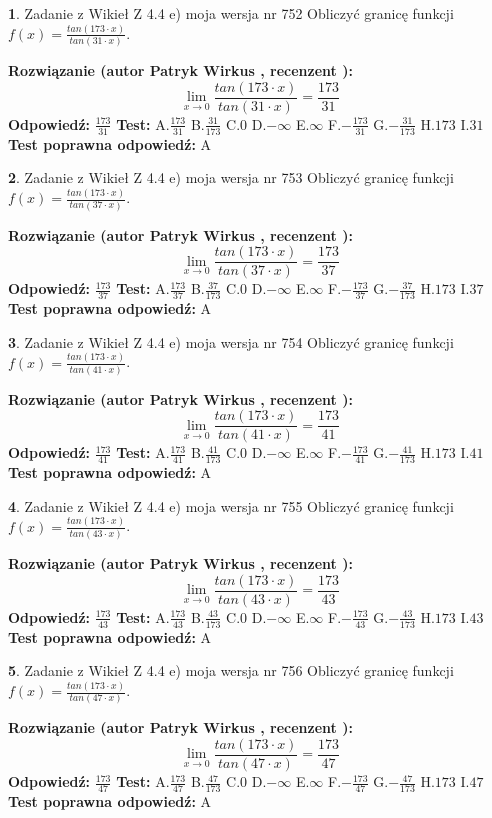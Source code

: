 \documentclass[12pt, a4paper]{article}
\theoremstyle{definition} %
\newtheorem{zad}{}
\newcommand{\zadStart}[1]{\begin{zad}#1\newline}
\newcommand{\zadStop}{\end{zad}}
\newcommand{\rozwStart}[2]{\noindent \textbf{Rozwiązanie (autor #1 , recenzent #2): }\newline}
\newcommand{\rozwStop}{\newline}
\newcommand{\odpStart}{\noindent \textbf{Odpowiedź:}\newline}
\newcommand{\odpStop}{\newline}
\newcommand{\testStart}{\noindent \textbf{Test:}\newline}
\newcommand{\testStop}{\newline}
\newcommand{\kluczStart}{\noindent \textbf{Test poprawna odpowiedź:}\newline}
\newcommand{\kluczStop}{\newline}
\begin{document}
\zadStart{Zadanie z Wikieł Z 4.4 e) moja wersja nr 752}
Obliczyć granicę funkcji $f(x)=\frac{tan(173\cdot x)}{tan(31\cdot x)}$.
\zadStop
\rozwStart{Patryk Wirkus}{}
$$\lim\limits_{x\to 0}\frac{tan(173\cdot x)}{tan(31\cdot x)}=
\frac{173}{31}$$
\rozwStop
\odpStart
$\frac{173}{31}$
\odpStop
\testStart
A.$\frac{173}{31}$
B.$\frac{31}{173}$
C.$0$
D.$-\infty$
E.$\infty$
F.$-\frac{173}{31}$
G.$-\frac{31}{173}$
H.$173$
I.$31$
\testStop
\kluczStart
A
\kluczStop



\zadStart{Zadanie z Wikieł Z 4.4 e) moja wersja nr 753}
Obliczyć granicę funkcji $f(x)=\frac{tan(173\cdot x)}{tan(37\cdot x)}$.
\zadStop
\rozwStart{Patryk Wirkus}{}
$$\lim\limits_{x\to 0}\frac{tan(173\cdot x)}{tan(37\cdot x)}=
\frac{173}{37}$$
\rozwStop
\odpStart
$\frac{173}{37}$
\odpStop
\testStart
A.$\frac{173}{37}$
B.$\frac{37}{173}$
C.$0$
D.$-\infty$
E.$\infty$
F.$-\frac{173}{37}$
G.$-\frac{37}{173}$
H.$173$
I.$37$
\testStop
\kluczStart
A
\kluczStop



\zadStart{Zadanie z Wikieł Z 4.4 e) moja wersja nr 754}
Obliczyć granicę funkcji $f(x)=\frac{tan(173\cdot x)}{tan(41\cdot x)}$.
\zadStop
\rozwStart{Patryk Wirkus}{}
$$\lim\limits_{x\to 0}\frac{tan(173\cdot x)}{tan(41\cdot x)}=
\frac{173}{41}$$
\rozwStop
\odpStart
$\frac{173}{41}$
\odpStop
\testStart
A.$\frac{173}{41}$
B.$\frac{41}{173}$
C.$0$
D.$-\infty$
E.$\infty$
F.$-\frac{173}{41}$
G.$-\frac{41}{173}$
H.$173$
I.$41$
\testStop
\kluczStart
A
\kluczStop



\zadStart{Zadanie z Wikieł Z 4.4 e) moja wersja nr 755}
Obliczyć granicę funkcji $f(x)=\frac{tan(173\cdot x)}{tan(43\cdot x)}$.
\zadStop
\rozwStart{Patryk Wirkus}{}
$$\lim\limits_{x\to 0}\frac{tan(173\cdot x)}{tan(43\cdot x)}=
\frac{173}{43}$$
\rozwStop
\odpStart
$\frac{173}{43}$
\odpStop
\testStart
A.$\frac{173}{43}$
B.$\frac{43}{173}$
C.$0$
D.$-\infty$
E.$\infty$
F.$-\frac{173}{43}$
G.$-\frac{43}{173}$
H.$173$
I.$43$
\testStop
\kluczStart
A
\kluczStop



\zadStart{Zadanie z Wikieł Z 4.4 e) moja wersja nr 756}
Obliczyć granicę funkcji $f(x)=\frac{tan(173\cdot x)}{tan(47\cdot x)}$.
\zadStop
\rozwStart{Patryk Wirkus}{}
$$\lim\limits_{x\to 0}\frac{tan(173\cdot x)}{tan(47\cdot x)}=
\frac{173}{47}$$
\rozwStop
\odpStart
$\frac{173}{47}$
\odpStop
\testStart
A.$\frac{173}{47}$
B.$\frac{47}{173}$
C.$0$
D.$-\infty$
E.$\infty$
F.$-\frac{173}{47}$
G.$-\frac{47}{173}$
H.$173$
I.$47$
\testStop
\kluczStart
A
\kluczStop
\end{document}
